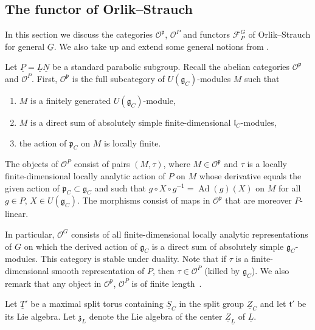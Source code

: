 \documentclass[a4paper]{amsart}
\numberwithin{equation}{section}
\theoremstyle{remark}
\theoremstyle{definition}
\DeclareMathOperator{\Ad}{Ad}
\newcommand{\alggrp}[1]{\underline{#1}}
\begin{document}
\subsection{The functor of Orlik--Strauch}
\label{sec:funct-orlik-stra}
In this section we discuss the categories $\mathcal{O}^{\mathfrak{p}}$, $\mathcal{O}^{P}$ and functors $\mathcal F_P^G$ of Orlik--Strauch for general $\alggrp G$.
We also take up and extend some general notions from \cite{orlik-functorial}.

Let $\alggrp{P} = \alggrp{L}\alggrp{N}$ be a standard parabolic subgroup.
Recall the abelian categories $\mathcal{O}^{\mathfrak{p}}$ and $\mathcal{O}^{P}$.
First, $\mathcal{O}^{\mathfrak{p}}$ is the full subcategory of $U(\mathfrak{g}_{C})$-modules $M$ such that
\begin{enumerate}
\item $M$ is a finitely generated $U(\mathfrak{g}_{C})$-module,
\item $M$ is a direct sum of absolutely simple finite-dimensional $\mathfrak{l}_{C}$-modules,
\item the action of $\mathfrak{p}_{C}$ on $M$ is locally finite.
\end{enumerate}

The objects of $\mathcal{O}^{P}$ consist of pairs $(M,\tau)$, where $M \in \mathcal{O}^{\mathfrak{p}}$ and $\tau$ is a locally finite-dimensional locally analytic action of $P$ on $M$
whose derivative equals the given action of $\mathfrak{p}_{C} \subset \mathfrak{g}_{C}$ and such that $g \circ X \circ g^{-1} = \Ad(g)(X)$ on $M$ for all $g \in P$, $X \in U(\mathfrak{g}_{C})$.
The morphisms consist of maps in $\mathcal O^{\mathfrak p}$ that are moreover $P$-linear.

In particular, $\mathcal{O}^{G}$ consists of all finite-dimensional locally analytic representations of $G$ on which the derived action of $\mathfrak{g}_{C}$ is a direct sum of absolutely simple $\mathfrak{g}_{C}$-modules.
This category is stable under duality.
Note that if $\tau$ is a finite-dimensional smooth representation of $P$, then $\tau \in \mathcal{O}^{P}$ (killed by $\mathfrak{g}_{C}$).
We also remark that any object in $\mathcal{O}^{\mathfrak{p}}$, $\mathcal{O}^{P}$ is of finite length~\cite[1.11~Theorem]{humphreys-bgg}.

Let $\alggrp{T}'$ be a maximal split torus containing $\alggrp{S}_C$ in the split group $\alggrp{Z}_C$ and let $\mathfrak{t}'$ be its Lie algebra.
Let $\mathfrak{z}_{L}$ denote the Lie algebra of the center $\alggrp Z_{\alggrp L}$ of $\alggrp L$.
\end{document}

